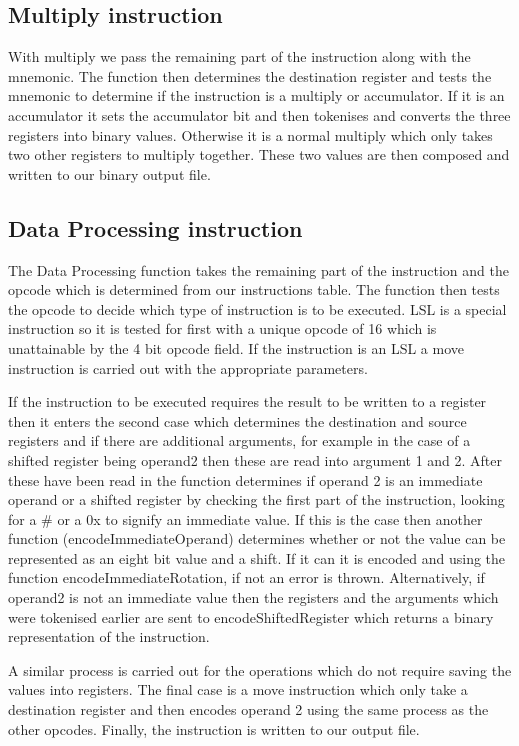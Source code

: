 \documentclass[11pt]{article}
\begin{document}
\subsection{Multiply instruction}
With multiply we pass the remaining part of the instruction along with the mnemonic. The function then determines the destination register and tests the mnemonic to determine if the instruction is a multiply or accumulator. If it is an accumulator it sets the accumulator bit and then tokenises and converts the three registers into binary values. Otherwise it is a normal multiply which only takes two other registers to multiply together. These two values are then composed and written to our binary output file. \par
\subsection{Data Processing instruction}
The Data Processing function takes the remaining part of the instruction and the opcode which is determined from our instructions table. The function then tests the opcode to decide which type of instruction is to be executed. LSL is a special instruction so it is tested for first with a unique opcode of 16 which is unattainable by the 4 bit opcode field. If the instruction is an LSL a move instruction is carried out with the appropriate parameters. \par
If the instruction to be executed requires the result to be written to a register then it enters the second case which determines the destination and source registers and if there are additional arguments, for example in the case of a shifted register being operand2 then these are read into argument 1 and 2. After these have been read in the function determines if operand 2 is an immediate operand or a shifted register by checking the first part of the instruction, looking for a \# or a 0x to signify an immediate value. If this is the case then another function (encodeImmediateOperand) determines whether or not the value can be represented as an eight bit value and a shift. If it can it is encoded and using the function encodeImmediateRotation, if not an error is thrown. Alternatively, if operand2 is not an immediate value then the registers and the arguments which were tokenised earlier are sent to encodeShiftedRegister which returns a binary representation of the instruction. \par
A similar process is carried out for the operations which do not require saving the values into registers. The final case is a move instruction which only take a destination register and then encodes operand 2 using the same process as the other opcodes. Finally, the instruction is written to our output file.
\end{document}
